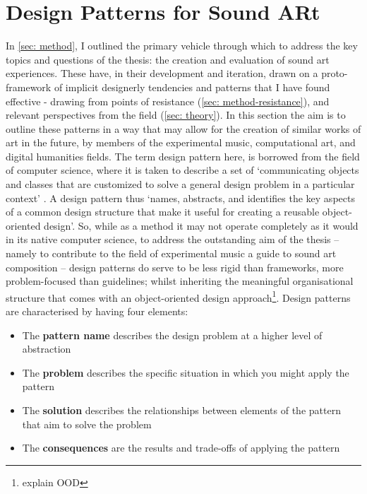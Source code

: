 \section{Design Patterns for Sound ARt}\label{sec: discussion-patterns}
In \autoref{sec: method}, I outlined the primary vehicle through which to address the key topics and questions of the thesis: the creation and evaluation of sound \gls{art} experiences. These have, in their development and iteration, drawn on a proto-framework of implicit designerly tendencies and patterns that I have found effective - drawing from points of resistance (\autoref{sec: method-resistance}), and relevant perspectives from the field (\autoref{sec: theory}). In this section the aim is to outline these patterns in a way that may allow for the creation of similar works of \gls{art} in the future, by members of the experimental music, computational art, and digital humanities fields. The term design pattern here, is borrowed from the field of computer science, where it is taken to describe a set of `communicating objects and classes that are customized to solve a general design problem in a particular context' \citep{gamma1995}. A design pattern thus `names, abstracts, and identifies the key aspects of a common design structure that make it useful for creating a reusable object-oriented design'. So, while as a method it may not operate completely as it would in its native computer science, to address the outstanding aim of the thesis -- namely to contribute to the field of experimental music a guide to sound \gls{art} composition -- design patterns do serve to be less rigid than frameworks, more problem-focused than guidelines; whilst inheriting the meaningful organisational structure that comes with an object-oriented design approach\footnote{explain OOD}. Design patterns are characterised by having four elements:
\begin{itemize}
    \item The \textbf{pattern name} describes the design problem at a higher level of abstraction
    \item The \textbf{problem} describes the specific situation in which you might apply the pattern
    \item The \textbf{solution} describes the relationships between elements of the pattern that aim to solve the problem
    \item The \textbf{consequences} are the results and trade-offs of applying the pattern
\end{itemize}

